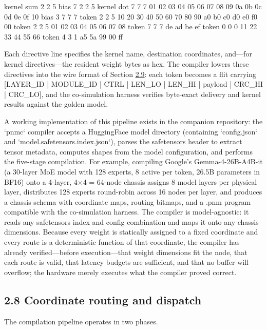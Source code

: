 \documentclass[10pt,twocolumn]{article}
\begin{document}
kernel sum 2 2 5
bias   7 2 2 5
kernel dot 7 7 7 01 02 03 04 05 06 07 08 09 0a 0b 0c 0d 0e 0f 10
bias   3 7 7 7
token 2 2 5   10 20 30 40 50 60 70 80 90 a0 b0 c0 d0 e0 f0 00
token 2 2 5   01 02 03 04 05 06 07 08
token 7 7 7   de ad be ef
token 0 0 0   11 22 33 44 55 66
token 4 3 1   a5 5a 99 00 ff

Each directive line specifies the kernel name, destination coordinates, and---for kernel directives---the resident weight bytes as hex. The compiler lowers these directives into the wire format of Section \hyperref[sec:2.9]{2.9}: each token becomes a flit carrying [LAYER\_ID | MODULE\_ID | CTRL | LEN\_LO | LEN\_HI | payload | CRC\_HI | CRC\_LO], and the co-simulation harness verifies byte-exact delivery and kernel results against the golden model.

A working implementation of this pipeline exists in the companion repository: the `pnmc` compiler accepts a HuggingFace model directory (containing `config.json` and `model.safetensors.index.json`), parses the safetensors header to extract tensor metadata, computes shapes from the model configuration, and performs the five-stage compilation. For example, compiling Google's Gemma-4-26B-A4B-it (a 30-layer MoE model with 128 experts, 8 active per token, 26.5B parameters in BF16) onto a 4-layer, 4$\times$4 = 64-node chassis assigns 8 model layers per physical layer, distributes 128 experts round-robin across 16 nodes per layer, and produces a chassis schema with coordinate maps, routing bitmaps, and a .pnm program compatible with the co-simulation harness. The compiler is model-agnostic: it reads any safetensors index and config combination and maps it onto any chassis dimensions. Because every weight is statically assigned to a fixed coordinate and every route is a deterministic function of that coordinate, the compiler has already verified---before execution---that weight dimensions fit the node, that each route is valid, that latency budgets are sufficient, and that no buffer will overflow; the hardware merely executes what the compiler proved correct.

\subsection*{2.8 Coordinate routing and dispatch}\label{sec:2.8}

The compilation pipeline operates in two phases.
\end{document}
